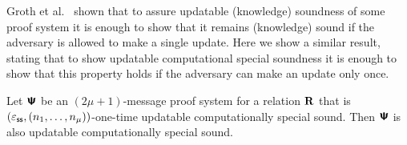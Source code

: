 \documentclass[runningheads,11pt]{llncs}
\begin{document}
Groth et al.~\cite[Lemma 6]{C:GKMMM18} shown that to assure updatable
(knowledge) soundness of some proof system it is enough to show that it remains
(knowledge) sound if the adversary is allowed to make a single update. Here we
show a similar result, stating that to show updatable computational special
soundness it is enough to show that this property holds if the adversary can
make an update only once.

\begin{lemma}
  \label{lem:otucss_to_ucss}
  Let $\bm{\mathsf{\Psi}}$ be an $(2 \mu + 1)$-message proof system for a relation $\mathbf{R}$ that
  is $(\varepsilon_{\mathsf{ss}}, (n_1, \ldots, n_\mu))$-one-time updatable computationally
    special sound. Then $\bm{\mathsf{\Psi}}$ is also updatable computationally special sound.
\end{lemma}
\end{document}
